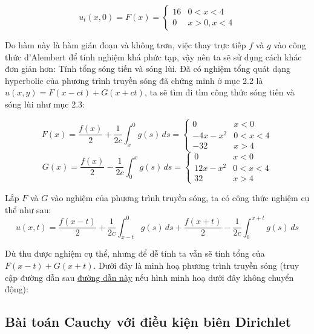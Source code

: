 \documentclass[a4paper]{article}
\begin{document}
\begin{equation*}
u_t(x, 0) = F(x) = 
\begin{cases}
16 & 0 < x < 4  \\
0 & x > 0, x < 4
\end{cases}
\end{equation*}

Do hàm này là hàm gián đoạn và không trơn, việc thay trực tiếp $f$ và $g$ vào công thức d'Alembert để tính nghiệm khá phức tạp, vậy nên ta sẽ sử dụng cách khác đơn giản hơn: Tính tổng sóng tiến và sóng lùi. Đã có nghiệm tổng quát dạng hyperbolic của phương trình truyền sóng đã chứng minh ở mục 2.2 là $u(x, y) = F(x - ct) + G(x + ct)$, ta sẽ tìm đi tìm công thức sóng tiến và sóng lùi như mục 2.3:

\begin{equation*}
F(x) = \frac{f(x)}{2}  + \frac{1}{2c} \int_{x}^{0} g(s) \,ds = 
\begin{cases}
0 & x < 0 \\
-4x-x^2 & 0 < x < 4 \\
-32 & x > 4
\end{cases}
\end{equation*}
\begin{equation*}
G(x) = \frac{f(x)}{2} - \frac{1}{2c} \int_{0}^{x} g(s) \,ds = 
\begin{cases}
0 & x < 0 \\
12x-x^2 & 0 < x < 4 \\
32 & x > 4
\end{cases}
\end{equation*}

Lắp $F$ và $G$ vào nghiệm của phương trình truyền sóng, ta có công thức nghiệm cụ thể như sau:
\begin{equation*}
    u(x,t) = \frac{f(x-t)}{2}  + \frac{1}{2c} \int_{x-t}^{0} g(s) \, ds + \frac{f(x+t)}{2} - \frac{1}{2c} \int_{0}^{x+t} g(s) \,ds
\end{equation*}

Dù thu được nghiệm cụ thể, nhưng để dễ tính ta vẫn sẽ tính tổng của $F(x - t) + G(x + t)$. Dưới đây là minh hoạ phương trình truyền sóng (truy cập đường dẫn sau \href{https://imgur.com/Kkt0MeT}{đường dẫn này} nếu hình minh hoạ dưới đây không chuyển động):

\begin{frame}{}
\end{frame}

\subsection{Bài toán Cauchy với điều kiện biên Dirichlet}
\end{document}
